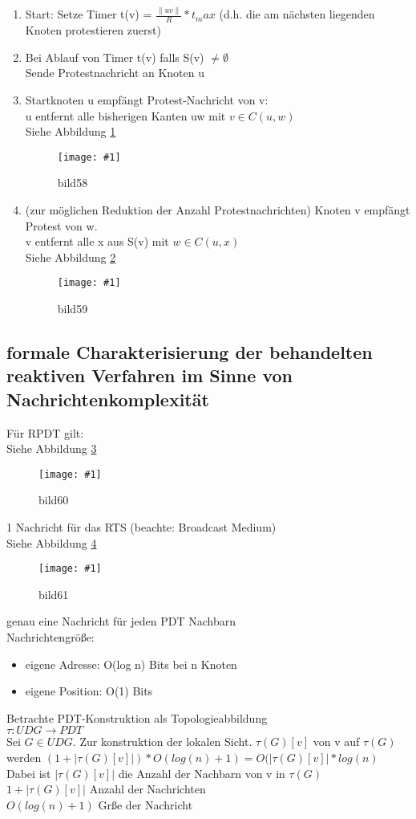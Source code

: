 \documentclass{article}
\newcommand{\bild}[4]{ %
	\begin{figure}[h!]
		\centering
		\texttt{[image: \#1]}
		\caption{#3}
		\label{#4}
	\end{figure}	
}
\newcommand{\sieheBild}[4]{
	Siehe Abbildung \ref{#4}
	\bild{#1}{#2}{#3}{#4}
}
\newcommand{\doubleAbs}[1]{
	\|#1\|
}
\begin{document}
\begin{enumerate}
	\item Start: Setze Timer t(v) = $\frac{\doubleAbs{uv}}{R} * t_max$ (d.h. die am nächsten liegenden Knoten protestieren zuerst)
	\item Bei Ablauf von Timer t(v) falls S(v) $\neq \emptyset$\\
	Sende Protestnachricht an Knoten u
	\item Startknoten u empfängt Protest-Nachricht von v:
	\\
	u entfernt alle bisherigen Kanten uw mit $v \in C(u,w)$\\
	\sieheBild{Bilder/58.png}{0.4}{bild58}{Bild 58}
	\item (zur möglichen Reduktion der Anzahl Protestnachrichten) Knoten v empfängt Protest von w.
	\\
	v entfernt alle x aus S(v) mit $w \in C(u,x)$\\
	\sieheBild{Bilder/59.png}{0.4}{bild59}{Bild 59}
\end{enumerate}

\subsection{formale Charakterisierung der behandelten reaktiven Verfahren im Sinne von Nachrichtenkomplexität}
Für RPDT gilt: \\
\sieheBild{Bilder/60.png}{0.4}{bild60}{Bild 60}
1 Nachricht für das RTS (beachte: Broadcast Medium)\\
\sieheBild{Bilder/61.png}{0.4}{bild61}{Bild 61}
genau eine Nachricht für jeden PDT Nachbarn\\
Nachrichtengröße: 
\begin{itemize}
	\item eigene Adresse: O(log n) Bits bei n Knoten
	\item eigene Position: O(1) Bits
\end{itemize}
Betrachte PDT-Konstruktion als Topologieabbildung\\
$\tau : UDG \rightarrow PDT$
\\
Sei $G \in UDG$. Zur konstruktion der lokalen Sicht. $\tau (G)[v]$ von v auf $\tau (G)$ werden $ (1 +  | \tau (G)[v] |) * O(log(n) + 1) = O(|\tau(G)[v]| * log(n)$ \\
Dabei ist $| \tau (G)[v] |$  die Anzahl der Nachbarn von v in $\tau (G)$\\
$ 1 +  | \tau (G)[v] | $ Anzahl der Nachrichten\\
$O(log(n) + 1) $ Grße der Nachricht\\
\end{document}
